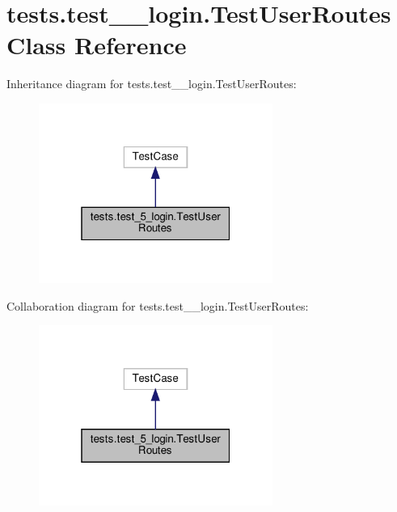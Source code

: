 \hypertarget{classtests_1_1test__5__login_1_1_test_user_routes}{}\section{tests.\+test\+\_\+\_\+login.\+Test\+User\+Routes Class Reference}
\label{classtests_1_1test__5__login_1_1_test_user_routes}


Inheritance diagram for tests.\+test\+\_\+\_\+login.\+Test\+User\+Routes\+:
\nopagebreak
\begin{figure}[H]
\begin{center}
\leavevmode
\includegraphics[width=217pt]{classtests_1_1test__5__login_1_1_test_user_routes__inherit__graph}
\end{center}
\end{figure}


Collaboration diagram for tests.\+test\+\_\+\_\+login.\+Test\+User\+Routes\+:
\nopagebreak
\begin{figure}[H]
\begin{center}
\leavevmode
\includegraphics[width=217pt]{classtests_1_1test__5__login_1_1_test_user_routes__coll__graph}
\end{center}
\end{figure}
